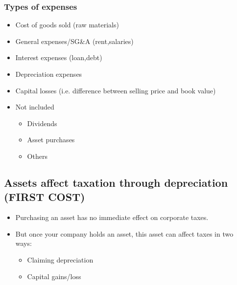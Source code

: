 \subsubsection{Types of expenses}
\begin{terminology}
    \begin{itemize}
        \item Cost of goods sold (raw materials)
        \item General expenses/SG\&A (rent,salaries)
        \item Interest expenses (loan,debt)
        \item Depreciation expenses
        \item Capital losses (i.e. difference between selling price and book value)
        \item Not included
        \begin{itemize}
            \item Dividends 
            \item Asset purchases 
            \item Others
        \end{itemize}
    \end{itemize}            
\end{terminology}

\subsection{Assets affect taxation through depreciation (FIRST COST)}
\begin{definition}
    \begin{itemize}
        \item Purchasing an asset has no immediate effect on corporate taxes.
        \item But once your company holds an asset, this asset can affect taxes in two ways:
        \begin{itemize}
            \item Claiming depreciation
            \item Capital gains/loss
        \end{itemize}
    \end{itemize}
\end{definition}

